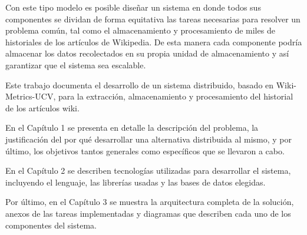 Con este tipo modelo es posible diseñar un sistema en donde todos sus componentes se dividan
de forma equitativa las tareas necesarias para resolver un problema común, tal como el almacenamiento y
procesamiento de miles de historiales de los artículos de Wikipedia. De esta manera cada componente podría
almacenar los datos recolectados en su propia unidad de almacenamiento y así garantizar que el sistema
sea escalable.

Este trabajo documenta el desarrollo de un sistema distribuido, basado en Wiki-Metrics-UCV,
para la extracción, almacenamiento y procesamiento del historial de los artículos wiki.

En el Capítulo 1 se presenta en detalle la descripción del problema, la justificación del por qué
desarrollar una alternativa distribuida al mismo, y por último, los objetivos tantos generales como
específicos que se llevaron a cabo.

En el Capítulo 2 se describen tecnologías utilizadas para desarrollar el sistema, incluyendo
el lenguaje, las librerías usadas y las bases de datos elegidas.

Por último, en el Capítulo 3 se muestra la arquitectura completa de la solución, anexos de las tareas
implementadas y diagramas que describen cada uno de los componentes del sistema.